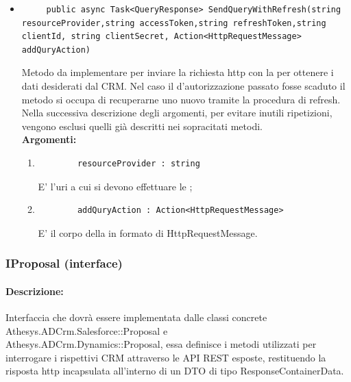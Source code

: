\begin{itemize}
	\item 
	\begin{lstlisting}
	 public async Task<QueryResponse> SendQueryWithRefresh(string resourceProvider,string accessToken,string refreshToken,string clientId, string clientSecret, Action<HttpRequestMessage> addQuryAction)
	\end{lstlisting}
	Metodo da implementare per inviare la richiesta http con la  per ottenere i dati desiderati dal CRM. Nel caso il  d'autorizzazione passato fosse scaduto il metodo si occupa di recuperarne uno nuovo tramite la procedura di refresh. Nella successiva descrizione degli argomenti, per evitare inutili ripetizioni, vengono esclusi quelli già descritti nei sopracitati metodi.\\
	\textbf{\small Argomenti:}
	\begin{enumerate}[leftmargin=*]
		\itemsep0em
		\item 
		\begin{lstlisting}
		resourceProvider : string
		\end{lstlisting}
		E' l'uri a cui si devono effettuare le ;
		\item 
		\begin{lstlisting}
		addQuryAction : Action<HttpRequestMessage>
		\end{lstlisting}
		E' il corpo della  in formato di HttpRequestMessage. 
	\end{enumerate}
\end{itemize}

\subsubsection{IProposal (interface)}

\paragraph{Descrizione:}
Interfaccia che dovrà essere implementata dalle classi concrete Athesys.ADCrm.Salesforce::Proposal e\\ Athesys.ADCrm.Dynamics::Proposal, essa definisce i metodi utilizzati per interrogare i rispettivi CRM attraverso le API REST esposte, restituendo la risposta http incapsulata all'interno di un DTO di tipo ResponseContainerData.

